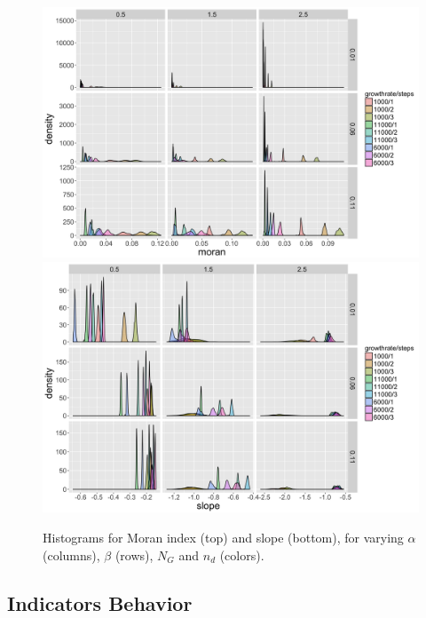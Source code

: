 \begin{figure}
\centering
\includegraphics[width=\textwidth]{figuresraw/hist_moran}\\
\includegraphics[width=\textwidth]{figuresraw/hist_slope}
\caption{Histograms for Moran index (top) and slope (bottom), for varying $\alpha$ (columns), $\beta$ (rows), $N_G$ and $n_d$ (colors).}
\label{fig:histograms}
\end{figure}







\subsection*{Indicators Behavior}


